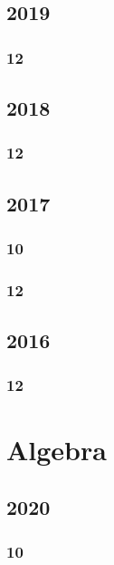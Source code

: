 \documentclass[11pt]{book}
\begin{document}
\section{2019}
\subsection{12}




\section{2018}
\subsection{12}




\section{2017}
\subsection{10}

\subsection{12}





\section{2016}
\subsection{12}




\chapter{Algebra}
\section{2020}
\subsection{10}

\end{document}
